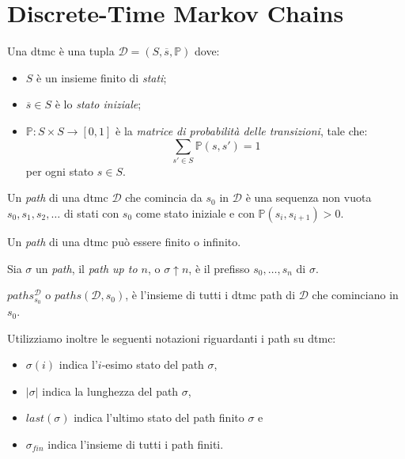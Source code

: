 \section{Discrete-Time Markov Chains}

\begin{mtdef}[\ac{dtmc}]
	Una \ac{dtmc} è una tupla $\mathcal{D} = (S,\overline{s},\mathbb{P})$ dove:
	\begin{itemize}
		\item $S$ è un insieme finito di \emph{stati};
		\item $\overline{s} \in S$ è lo \emph{stato iniziale};
		\item $\mathbb{P} : S \times S \rightarrow [0,1]$ è la \emph{matrice di probabilità delle transizioni}, tale che:
		$$ \sum_{s' \in S} \mathbb{P}(s,s') = 1$$
		per ogni stato $s \in S$.
	\end{itemize}
\end{mtdef}

\begin{mtdef}
	Un \emph{path} di una \ac{dtmc} $\mathcal{D}$ che comincia da $s_0$ in $\mathcal{D}$ è una sequenza non vuota $s_0, s_1, s_2, \dots$ di stati con $s_0$ come stato iniziale e con $\mathbb{P}(s_i, s_{i+1}) > 0$.
\end{mtdef}

\begin{mtobs}
	Un \emph{path} di una \ac{dtmc} può essere finito o infinito.
\end{mtobs}

\begin{mtdef}
	Sia $\sigma$ un \emph{path}, il \emph{path up to $n$}, o $\sigma \uparrow n$, è il prefisso $s_0, \dots, s_n$ di $\sigma$.
\end{mtdef}

\begin{mtdef}
	$paths_{s_0}^{\mathcal{D}}$ o $paths(\mathcal{D}, s_0)$, è l'insieme di tutti i \ac{dtmc} path di $\mathcal{D}$ che cominciano in $s_0$.
\end{mtdef}

Utilizziamo inoltre le seguenti notazioni riguardanti i path su \ac{dtmc}:
\begin{itemize}
	\item $\sigma(i)$ indica l'$i$-esimo stato del path $\sigma$,
	\item $|\sigma|$ indica la lunghezza del path $\sigma$,
	\item $last(\sigma)$ indica l'ultimo stato del path finito $\sigma$ e
	\item $\sigma_{fin}$ indica l'insieme di tutti i path finiti.
\end{itemize}

